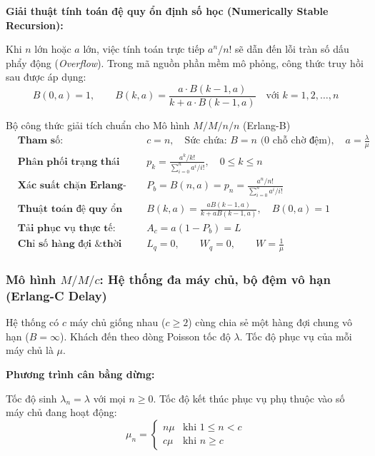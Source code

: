 \textbf{Giải thuật tính toán đệ quy ổn định số học (Numerically Stable Recursion):}

Khi $n$ lớn hoặc $a$ lớn, việc tính toán trực tiếp $a^n / n!$ sẽ dẫn đến lỗi tràn số dấu phẩy động (\textit{Overflow}). Trong mã nguồn phần mềm mô phỏng, công thức truy hồi sau được áp dụng:
\begin{equation}
    B(0, a) = 1, \qquad B(k, a) = \frac{a \cdot B(k-1, a)}{k + a \cdot B(k-1, a)} \quad \text{với } k = 1, 2, \dots, n
    \label{eq:erlang-b-recursion}
\end{equation}

\begin{modelbox}{Bộ công thức giải tích chuẩn cho Mô hình $M/M/n/n$ (Erlang-B)}
\begin{align*}
    &\textbf{Tham số:} && c = n, \quad \text{Sức chứa: } B = n \text{ (0 chỗ chờ đệm)}, \quad a = \frac{\lambda}{\mu} \\[4pt]
    &\textbf{Phân phối trạng thái dừng:} && p_k = \frac{a^k / k!}{\sum_{i=0}^n a^i / i!}, \quad 0 \le k \le n \\[4pt]
    &\textbf{Xác suất chặn Erlang-B:} && P_b = B(n, a) = p_n = \frac{a^n / n!}{\sum_{i=0}^n a^i / i!} \\[4pt]
    &\textbf{Thuật toán đệ quy ổn định:} && B(k, a) = \frac{a B(k-1, a)}{k + a B(k-1, a)}, \quad B(0, a) = 1 \\[4pt]
    &\textbf{Tải phục vụ thực tế:} && A_c = a(1 - P_b) = L \\[4pt]
    &\textbf{Chỉ số hàng đợi \& thời gian:} && L_q = 0, \qquad W_q = 0, \qquad W = \frac{1}{\mu}
\end{align*}
\end{modelbox}

\subsubsection{Mô hình \texorpdfstring{$M/M/c$}{M/M/c}: Hệ thống đa máy chủ, bộ đệm vô hạn (Erlang-C Delay)}

\hspace{0.5cm}Hệ thống có $c$ máy chủ giống nhau ($c \ge 2$) cùng chia sẻ một hàng đợi chung vô hạn ($B = \infty$). Khách đến theo dòng Poisson tốc độ $\lambda$. Tốc độ phục vụ của mỗi máy chủ là $\mu$.

\textbf{Phương trình cân bằng dừng:}

Tốc độ sinh $\lambda_n = \lambda$ với mọi $n \ge 0$. Tốc độ kết thúc phục vụ phụ thuộc vào số máy chủ đang hoạt động:
\begin{equation}
    \mu_n = \begin{cases} n\mu & \text{khi } 1 \le n < c \\ c\mu & \text{khi } n \ge c \end{cases}
\end{equation}

